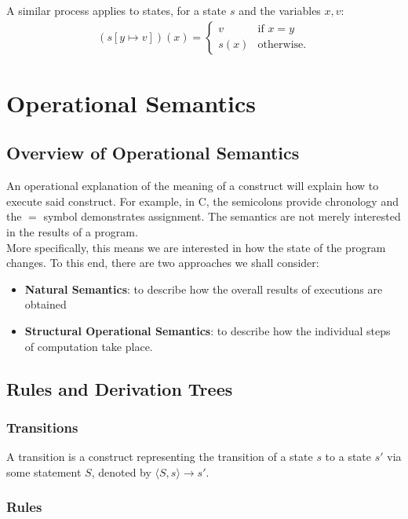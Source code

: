 \documentclass[a4paper, 12pt, twoside]{article}
\begin{document}
A similar process applies to states, for a state $s$ and the variables
$x, v$: \begin{gather*}
  (s[y\mapsto v])(x) = \begin{cases}
    v & \text{if } x = y \\
    s(x) & \text{otherwise}.
  \end{cases}
\end{gather*}

\newpage

\section{Operational Semantics}

\subsection{Overview of Operational Semantics}

An operational explanation of the meaning of a construct will explain
how to execute said construct. For example, in C, the semicolons provide
chronology and the $=$ symbol demonstrates assignment. The semantics
are not merely interested in the results of a program.
\\[\baselineskip]
More specifically, this means we are interested in how the state of the
program changes. To this end, there are two approaches we shall consider:
\begin{itemize}
  \item \textbf{Natural Semantics}: to describe how the overall
  results of executions are obtained
  \item \textbf{Structural Operational Semantics}: to describe how
  the individual steps of computation take place.
\end{itemize}

\subsection{Rules and Derivation Trees}

\subsubsection{Transitions}

A transition is a construct representing the transition of
a state $s$ to a state $s'$ via some statement $S$, denoted
by $\langle S, s \rangle \to s'$.

\subsubsection{Rules}
\end{document}

